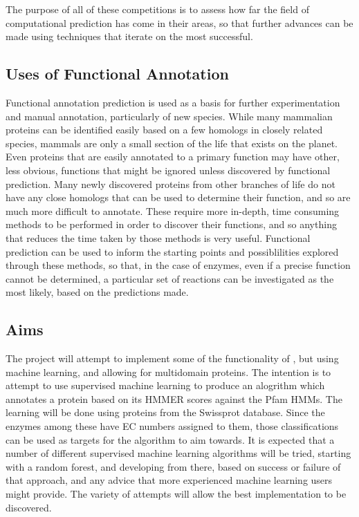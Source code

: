 \documentclass[12pt]{report}
\begin{document}
			The purpose of all of these competitions is to assess how far the field of computational prediction has come in their areas, so that further advances can be made using techniques that iterate on the most successful.
		
		\subsection{Uses of Functional Annotation}		
		
			Functional annotation prediction is used as a basis for further experimentation and manual annotation, particularly of new species.  While many mammalian proteins can be identified easily based on a few homologs in closely related species, mammals are only a small section of the life that exists on the planet.  Even proteins that are easily annotated to a primary function may have other, less obvious, functions that might be ignored unless discovered by functional prediction.  Many newly discovered proteins from other branches of life do not have any close homologs that can be used to determine their function, and so are much more difficult to annotate.  These require more in-depth, time consuming methods to be performed in order to discover their functions, and so anything that reduces the time taken by those methods is very useful.  Functional prediction can be used to inform the starting points and possiblilities explored through these methods, so that, in the case of enzymes, even if a precise function cannot be determined, a particular set of reactions can be investigated as the most likely, based on the predictions made.  
			
		\subsection{Aims}
		
			The project will attempt to implement some of the functionality of \cite{RefWorks:doc:5d88bf0fe4b037ddf3555c0b}, but using machine learning, and allowing for multidomain proteins.  The intention is to attempt to use supervised machine learning to produce an alogrithm which annotates a protein based on its HMMER scores against the Pfam HMMs.  The learning will be done using proteins from the Swissprot database.  Since the enzymes among these have EC numbers assigned to them, those classifications can be used as targets for the algorithm to aim towards.  It is expected that a number of different supervised machine learning algorithms will be tried, starting with a random forest, and developing from there, based on success or failure of that approach, and any advice that more experienced machine learning users might provide.  The variety of attempts will allow the best implementation to be discovered. 
		
\end{document}
